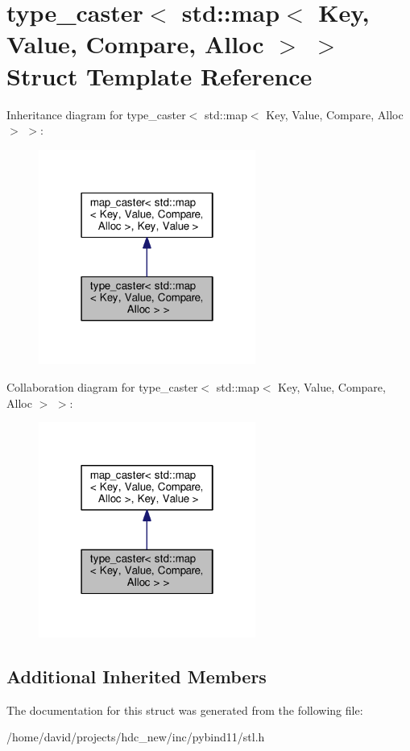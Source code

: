 \hypertarget{structtype__caster_3_01std_1_1map_3_01_key_00_01_value_00_01_compare_00_01_alloc_01_4_01_4}{}\section{type\+\_\+caster$<$ std\+:\+:map$<$ Key, Value, Compare, Alloc $>$ $>$ Struct Template Reference}
\label{structtype__caster_3_01std_1_1map_3_01_key_00_01_value_00_01_compare_00_01_alloc_01_4_01_4}


Inheritance diagram for type\+\_\+caster$<$ std\+:\+:map$<$ Key, Value, Compare, Alloc $>$ $>$\+:
\nopagebreak
\begin{figure}[H]
\begin{center}
\leavevmode
\includegraphics[width=202pt]{structtype__caster_3_01std_1_1map_3_01_key_00_01_value_00_01_compare_00_01_alloc_01_4_01_4__inherit__graph}
\end{center}
\end{figure}


Collaboration diagram for type\+\_\+caster$<$ std\+:\+:map$<$ Key, Value, Compare, Alloc $>$ $>$\+:
\nopagebreak
\begin{figure}[H]
\begin{center}
\leavevmode
\includegraphics[width=202pt]{structtype__caster_3_01std_1_1map_3_01_key_00_01_value_00_01_compare_00_01_alloc_01_4_01_4__coll__graph}
\end{center}
\end{figure}
\subsection*{Additional Inherited Members}


The documentation for this struct was generated from the following file\+:\begin{DoxyCompactItemize}
\item 
/home/david/projects/hdc\+\_\+new/inc/pybind11/stl.\+h\end{DoxyCompactItemize}
